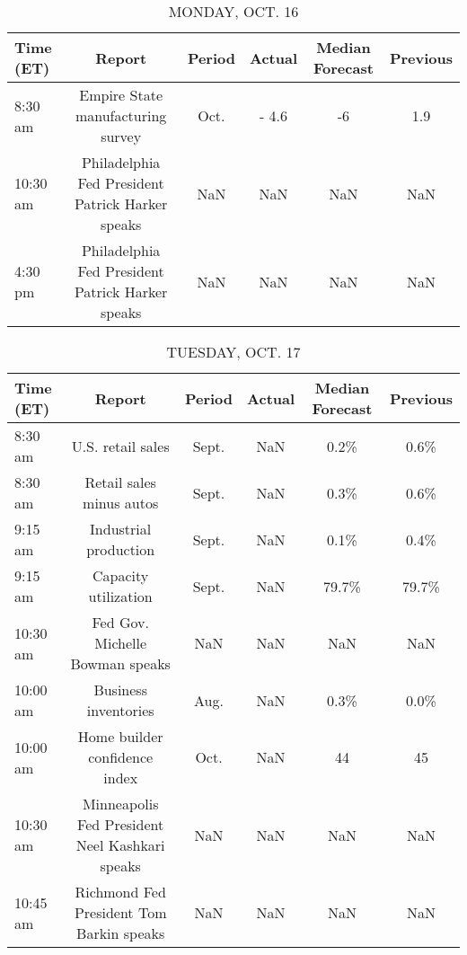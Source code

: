 \documentclass{article}%
\begin{document}
%
\normalsize%


\begin{table}[htbp]%
\caption{MONDAY, OCT. 16}%
\centering%
\begin{adjustbox}{width=1\textwidth}%
\begin{tabular}{lccccc}
\toprule
Time (ET) &                                           Report & Period & Actual & Median Forecast & Previous \\
\midrule
  8:30 am &                Empire State manufacturing survey &   Oct. &  - 4.6 &              -6 &      1.9 \\
 10:30 am & Philadelphia Fed President Patrick Harker speaks &    NaN &    NaN &             NaN &      NaN \\
  4:30 pm & Philadelphia Fed President Patrick Harker speaks &    NaN &    NaN &             NaN &      NaN \\
\bottomrule
\end{tabular}
%
\end{adjustbox}%
\end{table}

%


\begin{table}[htbp]%
\caption{TUESDAY, OCT. 17}%
\centering%
\begin{adjustbox}{width=1\textwidth}%
\begin{tabular}{lccccc}
\toprule
Time (ET) &                                         Report & Period & Actual & Median Forecast & Previous \\
\midrule
  8:30 am &                              U.S. retail sales &  Sept. &    NaN &            0.2\% &     0.6\% \\
  8:30 am &                       Retail sales minus autos &  Sept. &    NaN &            0.3\% &     0.6\% \\
  9:15 am &                          Industrial production &  Sept. &    NaN &            0.1\% &     0.4\% \\
  9:15 am &                           Capacity utilization &  Sept. &    NaN &           79.7\% &    79.7\% \\
 10:30 am &                Fed Gov. Michelle Bowman speaks &    NaN &    NaN &             NaN &      NaN \\
 10:00 am &                           Business inventories &   Aug. &    NaN &            0.3\% &     0.0\% \\
 10:00 am &                  Home builder confidence index &   Oct. &    NaN &              44 &       45 \\
 10:30 am & Minneapolis Fed President Neel Kashkari speaks &    NaN &    NaN &             NaN &      NaN \\
 10:45 am &       Richmond Fed President Tom Barkin speaks &    NaN &    NaN &             NaN &      NaN \\
\bottomrule
\end{tabular}
%
\end{adjustbox}%
\end{table}
\end{document}

